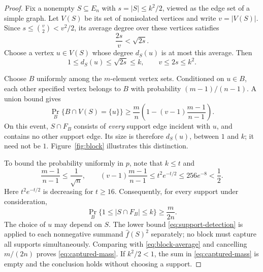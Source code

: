 \begin{proof}
Fix a nonempty $S\subseteq E_n$ with $s=|S|\le k^2/2$, viewed as
the edge set of a simple graph.  Let $V(S)$ be its set of nonisolated
vertices and write $v=|V(S)|$.  Since $s\le\binom v2<v^2/2$, its
average degree over these vertices satisfies
\[
 \frac{2s}{v}<\sqrt{2s}.
\]
Choose a vertex $u\in V(S)$ whose degree $d_S(u)$ is at most this average.  Then
\begin{equation}
 1\le d_S(u)\le\sqrt{2s}\le k,
 \qquad v\le2s\le k^2.
 \label{eq:support-degree}
\end{equation}

Choose $B$ uniformly among the $m$-element vertex sets.  Conditioned
on $u\in B$, each other specified vertex belongs to $B$ with
probability $(m-1)/(n-1)$.  A union bound gives
\begin{equation}
 \Pr_B\{B\cap V(S)=\{u\}\}
 \ge \frac mn
 \left(1-(v-1)\frac{m-1}{n-1}\right).
 \label{eq:one-vertex-event}
\end{equation}
On this event, $S\cap F_B$ consists of \emph{every} support edge
incident with $u$, and contains no other support edge.  Its size is
therefore $d_S(u)$, between $1$ and $k$; it need not be $1$.
Figure~\ref{fig:block} illustrates this distinction.



To bound the probability uniformly in $p$, note that $k\le t$ and
\[
 \frac{m-1}{n-1}\le\frac1{\sqrt n},
 \qquad
 (v-1)\frac{m-1}{n-1}
 \le t^2e^{-t/2}\le256e^{-8}<\frac12.
\]
Here $t^2e^{-t/2}$ is decreasing for $t\ge16$.
Consequently, for every support under consideration,
\begin{equation}
 \Pr_B\{1\le|S\cap F_B|\le k\}\ge\frac{m}{2n}.
 \label{eq:support-detection}
\end{equation}
The choice of $u$ may depend on $S$.  The lower bound
\eqref{eq:support-detection} is applied to each nonnegative summand
$\widehat f(S)^2$ separately; no block must capture all supports
simultaneously.  Comparing with \eqref{eq:block-average} and
cancelling $m/(2n)$ proves \eqref{eq:captured-mass}.
If $k^2/2<1$, the sum in \eqref{eq:captured-mass} is empty and the
conclusion holds without choosing a support.
\end{proof}

